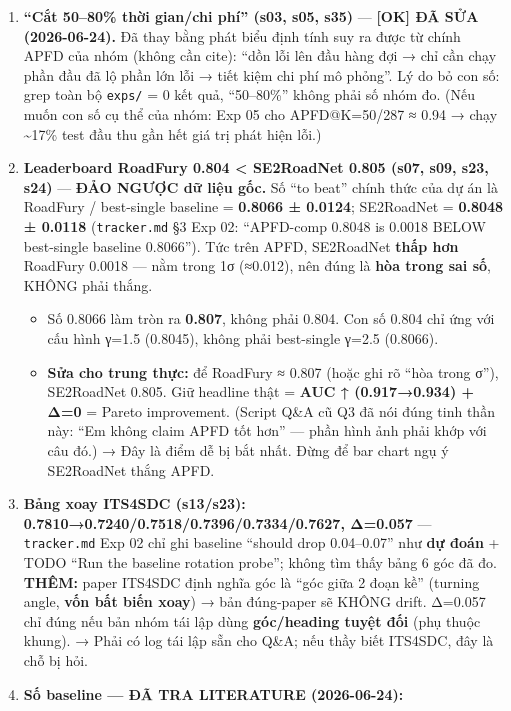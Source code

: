 \documentclass[
  11pt,
]{article}
\providecommand{\tightlist}{%
  \setlength{\itemsep}{0pt}\setlength{\parskip}{0pt}}
\begin{document}
\begin{enumerate}
\def\labelenumi{\arabic{enumi}.}
\item
  \textbf{``Cắt 50--80\% thời gian/chi phí'' (s03, s05, s35)} ---
  \textbf{{[}OK{]} ĐÃ SỬA (2026-06-24).} Đã thay bằng phát biểu định
  tính suy ra được từ chính APFD của nhóm (không cần cite): ``dồn lỗi
  lên đầu hàng đợi → chỉ cần chạy phần đầu đã lộ phần lớn lỗi → tiết
  kiệm chi phí mô phỏng''. Lý do bỏ con số: grep toàn bộ \texttt{exps/}
  = 0 kết quả, ``50--80\%'' không phải số nhóm đo. (Nếu muốn con số cụ
  thể của nhóm: Exp 05 cho APFD@K=50/287 ≈ 0.94 → chạy
  \textasciitilde17\% test đầu thu gần hết giá trị phát hiện lỗi.)
\item
  \textbf{Leaderboard RoadFury 0.804 \textless{} SE2RoadNet 0.805 (s07,
  s09, s23, s24)} --- \textbf{ĐẢO NGƯỢC dữ liệu gốc.} Số ``to beat''
  chính thức của dự án là RoadFury / best-single baseline =
  \textbf{0.8066 ± 0.0124}; SE2RoadNet = \textbf{0.8048 ± 0.0118}
  (\texttt{tracker.md} §3 Exp 02: ``APFD-comp 0.8048 is 0.0018 BELOW
  best-single baseline 0.8066''). Tức trên APFD, SE2RoadNet \textbf{thấp
  hơn} RoadFury 0.0018 --- nằm trong 1σ (≈0.012), nên đúng là
  \textbf{hòa trong sai số}, KHÔNG phải thắng.

  \begin{itemize}
  \tightlist
  \item
    Số 0.8066 làm tròn ra \textbf{0.807}, không phải 0.804. Con số 0.804
    chỉ ứng với cấu hình γ=1.5 (0.8045), không phải best-single γ=2.5
    (0.8066).
  \item
    \textbf{Sửa cho trung thực:} để RoadFury ≈ 0.807 (hoặc ghi rõ ``hòa
    trong σ''), SE2RoadNet 0.805. Giữ headline thật = \textbf{AUC ↑
    (0.917→0.934) + Δ=0} = Pareto improvement. (Script Q\&A cũ Q3 đã nói
    đúng tinh thần này: ``Em không claim APFD tốt hơn'' --- phần hình
    ảnh phải khớp với câu đó.) → Đây là điểm dễ bị bắt nhất. Đừng để bar
    chart ngụ ý SE2RoadNet thắng APFD.
  \end{itemize}
\item
  \textbf{Bảng xoay ITS4SDC (s13/s23):
  0.7810→0.7240/0.7518/0.7396/0.7334/0.7627, Δ=0.057} ---
  \texttt{tracker.md} Exp 02 chỉ ghi baseline ``should drop 0.04--0.07''
  như \textbf{dự đoán} + TODO ``Run the baseline rotation probe''; không
  tìm thấy bảng 6 góc đã đo. \textbf{THÊM:} paper ITS4SDC định nghĩa góc
  là ``góc giữa 2 đoạn kề'' (turning angle, \textbf{vốn bất biến xoay})
  → bản đúng-paper sẽ KHÔNG drift. Δ=0.057 chỉ đúng nếu bản nhóm tái lập
  dùng \textbf{góc/heading tuyệt đối} (phụ thuộc khung). → Phải có log
  tái lập sẵn cho Q\&A; nếu thầy biết ITS4SDC, đây là chỗ bị hỏi.
\item
  \textbf{Số baseline --- ĐÃ TRA LITERATURE (2026-06-24):}


\end{enumerate}
\end{document}
